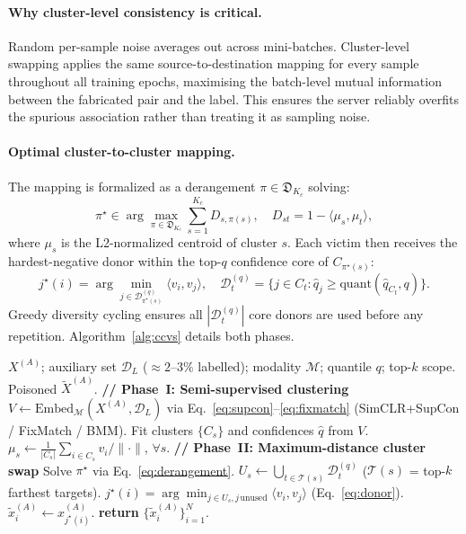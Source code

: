 \documentclass{article}
\begin{document}
\paragraph{Why cluster-level consistency is critical.}
Random per-sample noise averages out across mini-batches.
Cluster-level swapping applies the same source-to-destination mapping
for every sample throughout all training epochs, maximising the batch-level
mutual information between the fabricated pair and the label.
This ensures the server reliably overfits the spurious association rather
than treating it as sampling noise.

\paragraph{Optimal cluster-to-cluster mapping.}
The mapping is formalized as a derangement
$\pi\!\in\!\mathfrak{D}_{K_c}$ solving:
\begin{equation}
  \pi^\star \in \arg\!\max_{\pi\in\mathfrak{D}_{K_c}}
  \sum_{s=1}^{K_c} D_{s,\pi(s)},
  \quad
  D_{st}=1-\langle\mu_s,\mu_t\rangle,
  \label{eq:derangement}
\end{equation}
where $\mu_s$ is the L2-normalized centroid of cluster $s$.
Each victim then receives the hardest-negative donor within the top-$q$
confidence core of $C_{\pi^\star(s)}$:
\begin{equation}
  j^\star(i) = \arg\!\min_{j\in\mathcal{D}_{\pi^\star(s)}^{(q)}}
  \langle v_i,v_j\rangle,\quad
  \mathcal{D}_t^{(q)} = \{j\!\in\!C_t : \hat{q}_j\geq\mathrm{quant}(\hat{q}_{C_t},q)\}.
  \label{eq:donor}
\end{equation}
Greedy diversity cycling ensures all $|\mathcal{D}_t^{(q)}|$ core donors are
used before any repetition.
Algorithm~\ref{alg:ccvs} details both phases.

\begin{algorithm}[t]
\caption{CCVS: Two-Phase Cluster-Swap Attack on Party~A's View}
\label{alg:ccvs}
\begin{algorithmic}[1]
\REQUIRE $X^{(A)}$; auxiliary set $\mathcal{D}_L$ ($\approx\!2$--$3\%$ labelled);
  modality $\mathcal{M}$; quantile $q$; top-$k$ scope.
\ENSURE Poisoned $\tilde{X}^{(A)}$.
\STATE \textbf{// Phase~I: Semi-supervised clustering}
\STATE $V \leftarrow \mathrm{Embed}_{\mathcal{M}}(X^{(A)},\mathcal{D}_L)$
  via Eq.~\eqref{eq:supcon}--\eqref{eq:fixmatch} (SimCLR+SupCon / FixMatch / BMM).
\STATE Fit clusters $\{C_s\}$ and confidences $\hat{q}$ from $V$.
\STATE $\mu_s \leftarrow \frac{1}{|C_s|}\sum_{i\in C_s}v_i/\|\cdot\|$, $\forall s$.
\STATE \textbf{// Phase~II: Maximum-distance cluster swap}
\STATE Solve $\pi^\star$ via Eq.~\eqref{eq:derangement}.
  \STATE $U_s \leftarrow \bigcup_{t\in\mathcal{T}(s)}\mathcal{D}_t^{(q)}$
    ($\mathcal{T}(s)$ = top-$k$ farthest targets).
    \STATE $j^\star(i) = \arg\!\min_{j\in U_s, j\,\mathrm{unused}}
      \langle v_i,v_j\rangle$ (Eq.~\eqref{eq:donor}).
    \STATE $\tilde{x}_i^{(A)} \leftarrow x_{j^\star(i)}^{(A)}$.
  \ENDFOR
\ENDFOR
\STATE \textbf{return} $\{\tilde{x}_i^{(A)}\}_{i=1}^N$.
\end{algorithmic}
\end{algorithm}
\end{document}
